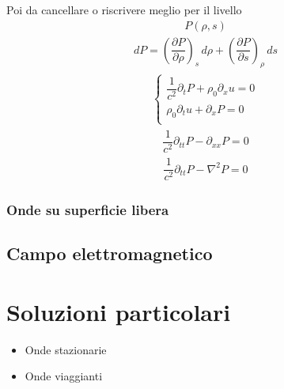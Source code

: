 \documentclass[letterpaper,10pt,italian]{jupyterBook}
\begin{document}
\sphinxAtStartPar
Poi da cancellare o riscrivere meglio per il livello
\begin{equation*}
\begin{split}P(\rho,s)\end{split}
\end{equation*}\begin{equation*}
\begin{split}d P = \left( \dfrac{\partial P}{\partial \rho} \right)_s \, d \rho + \left( \dfrac{\partial P}{\partial s} \right)_{\rho} \, ds \end{split}
\end{equation*}\begin{equation*}
\begin{split}
\begin{cases}
  \dfrac{1}{c^2} \partial_t P + \rho_0 \partial_x u = 0 \\
  \rho_0 \partial_t u + \partial_x P = 0 \\
\end{cases}
\end{split}
\end{equation*}\begin{equation*}
\begin{split}\dfrac{1}{c^2} \partial_{tt} P - \partial_{xx} P = 0\end{split}
\end{equation*}
\sphinxAtStartPar
{}
\begin{equation*}
\begin{split}\dfrac{1}{c^2} \partial_{tt} P - \nabla^2 P = 0\end{split}
\end{equation*}

\subsubsection{Onde su superficie libera}
\label{\detokenize{ch/waves/intro:onde-su-superficie-libera}}\label{\detokenize{ch/waves/intro:physics-hs-waves-equation-examples-fluids-surface}}

\subsection{Campo elettromagnetico}
\label{\detokenize{ch/waves/intro:campo-elettromagnetico}}\label{\detokenize{ch/waves/intro:physics-hs-waves-equation-examples-em}}

\section{Soluzioni particolari}
\label{\detokenize{ch/waves/intro:soluzioni-particolari}}\label{\detokenize{ch/waves/intro:physics-hs-waves-equation-solutions}}\begin{itemize}
\item {} 
\sphinxAtStartPar
Onde stazionarie

\item {} 
\sphinxAtStartPar
Onde viaggianti

\end{itemize}
\end{document}
